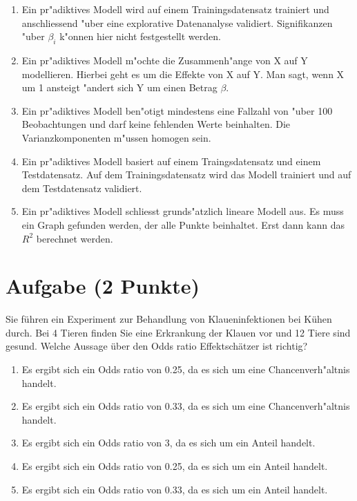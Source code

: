 \documentclass[a4paper, 10pt]{scrartcl}\usepackage[]{graphicx}\usepackage[]{xcolor}
\begin{document}
\begin{enumerate}
\item [\textbf{A} \msquare] Ein pr{"a}diktives Modell wird auf einem Trainingsdatensatz trainiert und anschliessend {"u}ber eine explorative Datenanalyse validiert. Signifikanzen {"u}ber $\beta_i$ k{"o}nnen hier nicht festgestellt werden.
\item [\textbf{B} \msquare] Ein pr{"a}diktives Modell m{"o}chte die Zusammenh{"a}nge von X auf Y modellieren. Hierbei geht es um die Effekte von X auf Y. Man sagt, wenn X um 1 ansteigt {"a}ndert sich Y um einen Betrag $\beta$.
\item [\textbf{C} \msquare] Ein pr{"a}diktives Modell ben{"o}tigt mindestens eine Fallzahl von {"u}ber 100 Beobachtungen und darf keine fehlenden Werte beinhalten. Die Varianzkomponenten m{"u}ssen homogen sein.
\item [\textbf{D} \msquare] Ein pr{"a}diktives Modell basiert auf einem Traingsdatensatz und einem Testdatensatz. Auf dem Trainingsdatensatz wird das Modell trainiert und auf dem Testdatensatz validiert.
\item [\textbf{E} \msquare] Ein pr{"a}diktives Modell schliesst grunds{"a}tzlich lineare Modell aus. Es muss ein Graph gefunden werden, der alle Punkte beinhaltet. Erst dann kann das $R^2$ berechnet werden.
\end{enumerate}

\section{Aufgabe \hfill (2 Punkte)}



Sie f{\"u}hren ein Experiment zur Behandlung von Klaueninfektionen bei K{\"u}hen
durch. Bei 4 Tieren finden Sie eine Erkrankung der Klauen vor und
12 Tiere sind gesund. Welche Aussage {\"u}ber den Odds ratio
Effektsch{\"a}tzer ist richtig?



\begin{enumerate}
\item [\textbf{A} \msquare] Es ergibt sich ein Odds ratio von 0.25, da es sich um eine Chancenverh{"a}ltnis handelt.
\item [\textbf{B} \msquare] Es ergibt sich ein Odds ratio von 0.33, da es sich um eine Chancenverh{"a}ltnis handelt.
\item [\textbf{C} \msquare] Es ergibt sich ein Odds ratio von 3, da es sich um ein Anteil handelt.
\item [\textbf{D} \msquare] Es ergibt sich ein Odds ratio von 0.25, da es sich um ein Anteil handelt.
\item [\textbf{E} \msquare] Es ergibt sich ein Odds ratio von 0.33, da es sich um ein Anteil handelt.
\end{enumerate}
\end{document}
